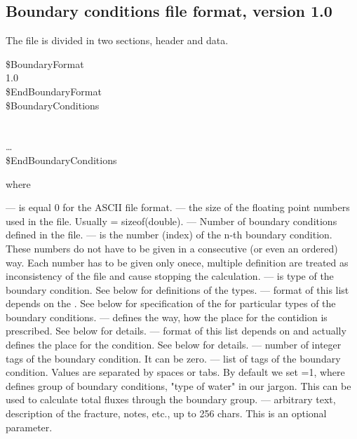 \subsection{Boundary conditions file format, version 1.0}
The file is divided in two sections, header and data.
\begin{fileformat}
\$BoundaryFormat\\
  1.0  \\
\$EndBoundaryFormat\\
\$BoundaryConditions\\
  \\
    
   
    \vari{[text]}\\
  \dots\\
\$EndBoundaryConditions\\
\end{fileformat}
where
\begin{description}
  --- is equal 0 for the ASCII file format.
  --- the size of the floating point numbers used in
  the file. Usually  = sizeof(double).
  --- Number of boundary conditions defined in the
  file.
  --- is the number (index) of the n-th boundary
  condition. These numbers do not have to be given in a consecutive (or even an
  ordered) way. Each number has to be given only onece, multiple definition
  are treated as inconsistency of the file and cause stopping the
  calculation.
  --- is type of the boundary condition. See below for
   definitions of the types.
  --- format of this list depends on the
   . See below for specification of the 
   for particular types of the boundary conditions.
  --- defines the way, how the place for the contidion is
   prescribed. See below for details.
  --- format of this list depends on 
   and actually defines the place for the condition. See below for details.
  --- number of integer tags of the boundary
  condition. It can be zero.
  --- list of tags of the
   boundary condition. Values are
   separated by spaces or tabs. By default we set
   =1, where  defines group of boundary
   conditions, "type of water" in our jargon. This can be used to calculate total fluxes through 
   the boundary group.
  --- arbitrary text, description of the fracture, notes,
   etc., up to 256 chars. This is an optional parameter.
\end{description}
